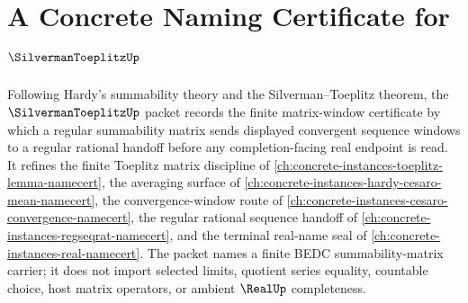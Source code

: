 \chapter{A Concrete Naming Certificate for $\SilvermanToeplitzUp$}
\label{ch:concrete-instances-silverman-toeplitz-namecert}

Following Hardy's summability theory and the Silverman--Toeplitz theorem, the $\SilvermanToeplitzUp$ packet records the finite matrix-window certificate by which a regular summability matrix sends displayed convergent sequence windows to a regular rational handoff before any completion-facing real endpoint is read. It refines the finite Toeplitz matrix discipline of \autoref{ch:concrete-instances-toeplitz-lemma-namecert}, the averaging surface of \autoref{ch:concrete-instances-hardy-cesaro-mean-namecert}, the convergence-window route of \autoref{ch:concrete-instances-cesaro-convergence-namecert}, the regular rational sequence handoff of \autoref{ch:concrete-instances-regseqrat-namecert}, and the terminal real-name seal of \autoref{ch:concrete-instances-real-namecert}. The packet names a finite BEDC summability-matrix carrier; it does not import selected limits, quotient series equality, countable choice, host matrix operators, or ambient $\RealUp$ completeness.

